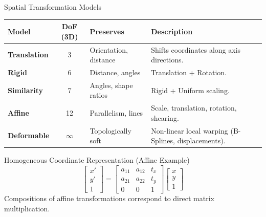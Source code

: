\documentclass[aspectratio=169,10pt]{beamer}
\begin{document}
\begin{frame}{Spatial Transformation Models}
\small
\begin{tabularx}{\textwidth}{l c >{\raggedright\arraybackslash}l X}
\toprule
\textbf{Model} & \textbf{DoF (3D)} & \textbf{Preserves} & \textbf{Description} \\
\midrule
\textbf{Translation} & 3 & Orientation, distance & Shifts coordinates along axis directions. \\
\textbf{Rigid} & 6 & Distance, angles & Translation + Rotation. \\
\textbf{Similarity} & 7 & Angles, shape ratios & Rigid + Uniform scaling. \\
\textbf{Affine} & 12 & Parallelism, lines & Scale, translation, rotation, shearing. \\
\textbf{Deformable} & $\infty$ & Topologically soft & Non-linear local warping (B-Splines, displacements). \\
\bottomrule
\end{tabularx}
\vfill
\begin{block}{Homogeneous Coordinate Representation (Affine Example)}
\[
\begin{bmatrix} x' \\ y' \\ 1 \end{bmatrix} = \begin{bmatrix} a_{11} & a_{12} & t_x \\ a_{21} & a_{22} & t_y \\ 0 & 0 & 1 \end{bmatrix} \begin{bmatrix} x \\ y \\ 1 \end{bmatrix}
\]
Compositions of affine transformations correspond to direct matrix multiplication.
\end{block}
\end{frame}
\end{document}
